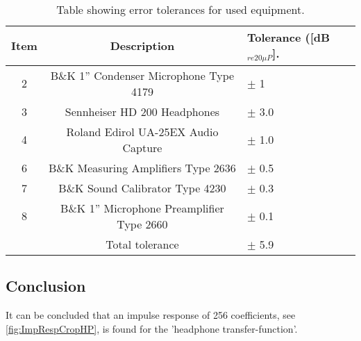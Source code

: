 \begin{table}[H]
	\centering
	\begin{tabular}{ c c l } \toprule
	{Item}	& 		{Description} 							& {Tolerance ([dB$_{re20\mu P}$]}.\\ \bottomrule 
		2	&	B\&K 1'' Condenser Microphone Type 4179 	& $\pm$ 1		\\
		3	&	Sennheiser HD 200 Headphones				& $\pm$ 3.0		\\
		4	&	Roland Edirol UA-25EX Audio Capture			& $\pm$ 1.0		\\
		6	&	B\&K Measuring Amplifiers Type 2636			& $\pm$ 0.5		\\
		7	&	B\&K Sound Calibrator Type 4230				& $\pm$ 0.3		\\ 
		8	&	B\&K 1'' Microphone Preamplifier Type 2660	& $\pm$ 0.1		\\ \bottomrule
			&	Total tolerance								& $\pm$ 5.9		\\ \bottomrule	
	\end{tabular}
	\caption{Table showing error tolerances for used equipment.}
	\label{TolerancesHP}
\end{table}

\subsection{Conclusion}
It can be concluded that an impulse response of 256 coefficients, see \autoref{fig:ImpRespCropHP}, is found for the 'headphone transfer-function'.
